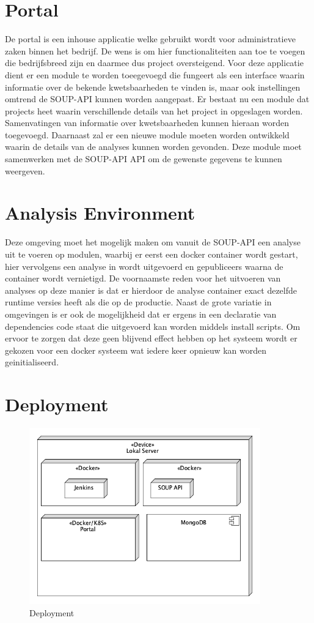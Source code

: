 \section{Portal}\label{sec:arch-portal} De portal is een inhouse applicatie welke gebruikt wordt voor administratieve zaken binnen het bedrijf. De wens is om hier functionaliteiten aan toe te voegen die bedrijfsbreed zijn en daarmee dus project oversteigend. Voor deze applicatie dient er een module te worden toeegevoegd die fungeert als een interface waarin informatie over de bekende kwetsbaarheden te vinden is, maar ook instellingen omtrend de SOUP-API kunnen worden aangepast. Er bestaat nu een module dat projects heet waarin verschillende details van het project in opgeslagen worden. Samenvatingen van informatie over kwetsbaarheden kunnen hieraan worden toegevoegd.
Daarnaast zal er een nieuwe module moeten worden ontwikkeld waarin de details van de analyses kunnen worden gevonden. Deze module moet samenwerken met de SOUP-API API om de gewenste gegevens te kunnen weergeven.

\section{Analysis Environment}\label{sec:analysis-environment}
Deze omgeving moet het mogelijk maken om vanuit de SOUP-API een analyse uit te voeren op modulen, waarbij er eerst een docker container wordt gestart, hier vervolgens een analyse in wordt uitgevoerd en gepubliceers waarna de container wordt vernietigd. De voornaamste reden voor het uitvoeren van analyses op deze manier is dat er hierdoor de analyse container exact dezelfde runtime versies heeft als die op de productie. Naast de grote variatie in omgevingen is er ook de mogelijkheid dat er ergens in een declaratie van dependencies code staat die uitgevoerd kan worden middels install scripts. Om ervoor te zorgen dat deze geen blijvend effect hebben op het systeem wordt er gekozen voor een docker systeem wat iedere keer opnieuw kan worden geinitialiseerd.

\section{Deployment}\label{sec:deployment}


\begin{figure}[bth]
    \myfloatalign
    \includegraphics[width=10cm]{gfx/umlet/exports/deployment}
    \caption{Deployment }
    \label{fig:deployment}
\end{figure}

